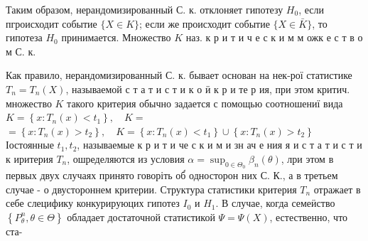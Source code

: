 \documentclass[10pt]{article}
\begin{document}
Таким образом, нерандомизированный С. к. отклоняет гипотезу $H_{0}$, если пгроисходит событие $\{X \in K\}$; если же происходит событие $\{X \in \bar{K}\}$, то гипотеза $H_{0}$ принимается. Множество $K$ наз. к р и т и ч е с к и м м ожк е с т в о м С. к.



Как правило, нерандомизированный С. к. бывает основан на нек-рої статистике $T_{n}=T_{n}(X)$, называемой с т а т и с т и к о ӥ к р и те р ия, при этом критич. множество $K$ такого критерия обычно задается с помощью соотношениї вида $K=\left\{x: T_{n}(x)<t_{1}\right\}, \quad K=$ $=\left\{x: T_{n}(x)>t_{2}\right\}, \quad K=\left\{x: T_{n}(x)<t_{1}\right\} \cup\left\{x: T_{n}(x)>t_{2}\right\}$ Іостоянные $t_{1}, t_{2}$, называемые к р и т и че с к и м и зн ач е ния я и с т а т и с т и к иритерия $T_{n}$, ошределяются из условия $\alpha=\sup _{0 \in \Theta_{0}} \beta_{n}(\theta)$, лри этом в первых двух случаях принято говоріть об́ односторон них С. К., а в третьем случае - о двустороннем критерии. Структура статистики критерия $T_{n}$ отражает в себе слецифику конкурируюцих гипотез $I_{0}$ и $H_{1}$. В случае, когда семеӥство $\left\{P_{\theta}^{n}, \theta \in \Theta\right\}$ обладает достаточной статистикой $\Psi=\Psi(X)$, естественно, что ста-
\end{document}
